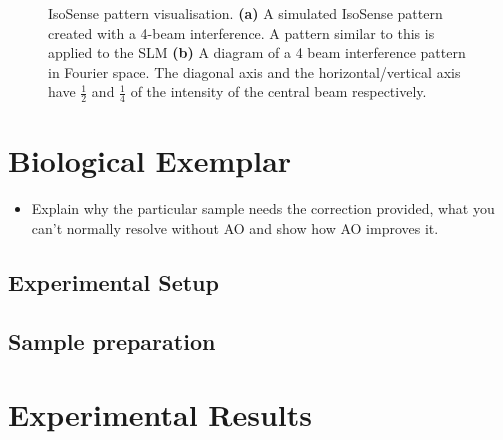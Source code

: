 \begin{figure}[h]
\begin{subfigure}{0.4\textwidth}
		\caption{}
		\label{fig:isosense_visualisation_ft}
	\end{subfigure}
	\caption[IsoSense pattern visualisation.]{IsoSense pattern visualisation. \textbf{(a)} A simulated IsoSense pattern created with a 4-beam interference. A pattern similar to this is applied to the SLM \textbf{(b)} A diagram of a 4 beam interference pattern in Fourier space. The diagonal axis and the horizontal/vertical axis have $\frac{1}{2}$ and $\frac{1}{4}$ of the intensity of the central beam respectively.}
	\label{fig:isosense_visualisation}
\end{figure}

\section{Biological Exemplar}
\label{sec:SIM_biology}

\begin{itemize}
	\item Explain why the particular sample needs the correction provided, what you can't normally resolve without AO and show how  AO improves it.
\end{itemize}

\subsection{Experimental Setup}
\label{subsec:SIM_setup}

\subsection{Sample preparation}
\label{subsec:SIM_sample_prep}

\section{Experimental Results}
\label{sec:SIM_results}
